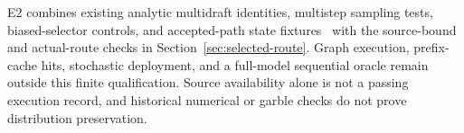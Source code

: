 \documentclass[conference]{IEEEtran}
\begin{document}
E2 combines existing analytic multidraft identities, multistep sampling tests, biased-selector controls, and accepted-path state fixtures~\cite{lumo2026archive} with the source-bound and actual-route checks in Section~\ref{sec:selected-route}. Graph execution, prefix-cache hits, stochastic deployment, and a full-model sequential oracle remain outside this finite qualification. Source availability alone is not a passing execution record, and historical numerical or garble checks do not prove distribution preservation.

\label{ReferencesStart}


\end{document}
